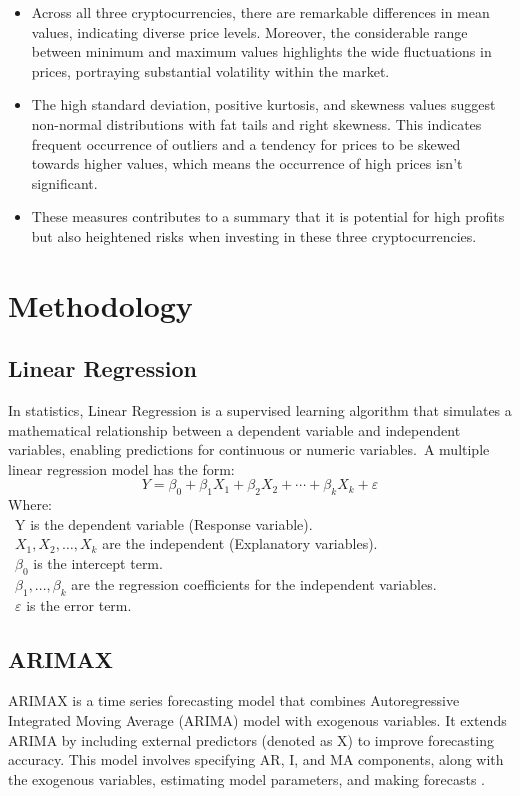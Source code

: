 \documentclass{ieeeojies}
\begin{document}
\begin{itemize}
    \item Across all three cryptocurrencies, there are remarkable differences in mean values, indicating diverse price levels. Moreover, the considerable range between minimum and maximum values highlights the wide fluctuations in prices, portraying substantial volatility within the market.
    \item The high standard deviation, positive kurtosis, and skewness values suggest non-normal distributions with fat tails and right skewness. This indicates frequent occurrence of outliers and a tendency for prices to be skewed towards higher values, which means the occurrence of high prices isn't significant.
    \item These measures contributes to a summary that it is potential for high profits but also heightened risks when investing in these three cryptocurrencies.

\end{itemize}

\section{Methodology}
\subsection{Linear Regression}
In statistics, Linear Regression is a supervised learning algorithm that simulates a mathematical relationship between a dependent variable and independent
variables, enabling predictions for continuous or numeric variables.\
A multiple linear regression model has the form:
\[Y=\beta_0+\beta_1X_1+\beta_2X_2+\cdots+\beta_kX_k+\varepsilon\]
Where:\\
\indent\textbullet\ Y is the dependent variable (Response variable).\\
\indent\textbullet\ \(X_1, X_2, \ldots, X_k\) are the independent (Explanatory variables).\\
\indent\textbullet\ \(\beta_0\) is the intercept term.\\
\indent\textbullet\ \(\beta_1,..., \beta_k\) are the regression coefficients for the independent variables.\\
\indent\textbullet\ \(\varepsilon\) is the error term.
\subsection{ARIMAX}
\raggedright
ARIMAX is a time series forecasting model that combines Autoregressive Integrated Moving Average (ARIMA) model with exogenous variables. It extends  ARIMA by  including external  predictors  (denoted as  X) to improve  forecasting accuracy.  This model involves  specifying AR, I,  and MA components,  along with the  exogenous variables, estimating model parameters, and making forecasts \cite{b3}.\\
\end{document}
